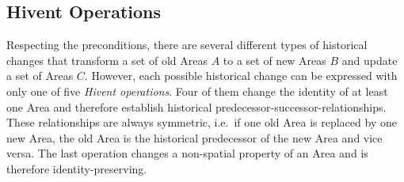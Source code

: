 
\subsection{Hivent Operations} %
\label{sub:hivent_operations}

Respecting the preconditions, there are several different types of historical changes that transform a set of old Areas $A$ to a set of new Areas $B$ and update a set of Areas $C$. However, each possible historical change can be expressed with only one of five \emph{Hivent operations}. Four of them change the identity of at least one Area and therefore establish historical predecessor-successor-relationships. These relationships are always symmetric, i.e.\ if one old Area is replaced by one new Area, the old Area is the historical predecessor of the new Area and vice versa. The last operation changes a non-spatial property of an Area and is therefore identity-preserving.

